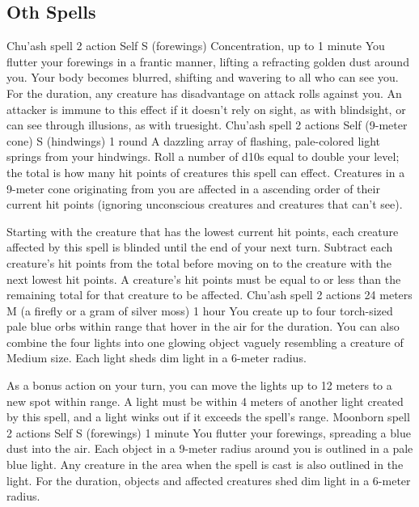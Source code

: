 \subsection*{Oth Spells}
        {Chu'ash spell}
        {2 action}
        {Self}
        {S (forewings)}
        {Concentration, up to 1 minute}
        You flutter your forewings in a frantic manner, lifting a refracting golden dust around you.
        Your body becomes blurred, shifting and wavering to all who can see you.
        For the duration, any creature has disadvantage on attack rolls against you.
        An attacker is immune to this effect if it doesn't rely on sight, as with blindsight, or can see through illusions, as with truesight.
        {Chu'ash spell}
        {2 actions}
        {Self (9-meter cone)}
        {S (hindwings)}
        {1 round}
        A dazzling array of flashing, pale-colored light springs from your hindwings.
        Roll a number of d10s equal to double your level; the total is how many hit points of creatures this spell can effect.
        Creatures in a 9-meter cone originating from you are affected in a ascending order of their current hit points (ignoring unconscious creatures and creatures that can't see).

        Starting with the creature that has the lowest current hit points, each creature affected by this spell is blinded until the end of your next turn.
        Subtract each creature's hit points from the total before moving on to the creature with the next lowest hit points.
        A creature's hit points must be equal to or less than the remaining total for that creature to be affected.
        {Chu'ash spell}
        {2 actions}
        {24 meters}
        {M (a firefly or a gram of silver moss)}
        {1 hour}
        You create up to four torch-sized pale blue orbs within range that hover in the air for the duration.
        You can also combine the four lights into one glowing object vaguely resembling a creature of Medium size.
        Each light sheds dim light in a 6-meter radius.

        As a bonus action on your turn, you can move the lights up to 12 meters to a new spot within range.
        A light must be within 4 meters of another light created by this spell, and a light winks out if it exceeds the spell's range.
        {Moonborn spell}
        {2 actions}
        {Self}
        {S (forewings)}
        {1 minute}
        You flutter your forewings, spreading a blue dust into the air.
        Each object in a 9-meter radius around you is outlined in a pale blue light.
        Any creature in the area when the spell is cast is also outlined in the light.
        For the duration, objects and affected creatures shed dim light in a 6-meter radius.

